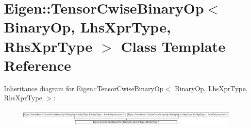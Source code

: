 \hypertarget{class_eigen_1_1_tensor_cwise_binary_op}{}\section{Eigen\+:\+:Tensor\+Cwise\+Binary\+Op$<$ Binary\+Op, Lhs\+Xpr\+Type, Rhs\+Xpr\+Type $>$ Class Template Reference}
\label{class_eigen_1_1_tensor_cwise_binary_op}
Inheritance diagram for Eigen\+:\+:Tensor\+Cwise\+Binary\+Op$<$ Binary\+Op, Lhs\+Xpr\+Type, Rhs\+Xpr\+Type $>$\+:\begin{figure}[H]
\begin{center}
\leavevmode
\includegraphics[height=0.880503cm]{class_eigen_1_1_tensor_cwise_binary_op}
\end{center}
\end{figure}
